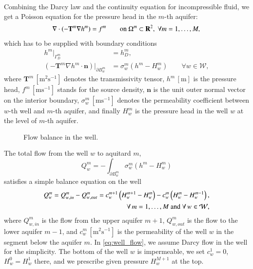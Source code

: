 \documentclass{elsarticle}
\newcommand{\figpath}{../graphics/}
\def\vc#1{\mathbf{\boldsymbol{#1}}}     %
\def\prtl{\partial}
\newcommand{\R}{\mathbf{R}}
\begin{document}
Combining the Darcy law and the continuity equation for incompressible fluid, we get
a Poisson equation for the pressure head in the $m$-th aquifer:
\begin{equation} \label{eqn:poisson}
\nabla\cdot(-\mathbf{T}^m\nabla h^m) = f^m \qquad \textrm{on } \Omega^m\subset\R^2,\; \forall m=1,\dots,M, \\
\end{equation}
which has to be supplied with boundary conditions
\begin{align}
h^m|_{\Gamma^m_D} &= h^m_D, \\
\left(-\mathbf{T}^m\nabla h^m\cdot\vc{n}\right)|_{\partial B^m_w} &= \sigma^m_w(h^m - H^m_w) \qquad \forall w\in\mathcal{W},
\end{align}
where $\mathbf{T}^m\, [\textrm{m}^2\textrm{s}^{-1}]$ denotes the transmissivity tensor,
$h^m\, [\textrm{m}]$ is the pressure head, $f^m\, [\textrm{m}\textrm{s}^{-1}]$ stands for the source density,
$\vc{n}$ is the unit outer normal vector on the interior boundary,
$\sigma^m_w\, [\textrm{m}\textrm{s}^{-1}]$ denotes the permeability coefficient between $w$-th well and 
$m$-th aquifer, and finally $H_w^m$ is the pressure head in the well $w$ at the level of $m$-th aquifer.
%
\begin{figure}[!htb]
  \begin{center}         
    \def\svgwidth{0.5\textwidth}
    
  \end{center}
  \caption{Flow balance in the well.}
  \label{fig:well_flows}
\end{figure}
%
The total flow from the well $w$ to aquitard $m$,
\[
    Q^m_w =-\int_{\prtl B^m_w} \sigma^m_w(h^m - H^m_w)
\]
satisfies a simple balance equation on the well
\begin{align}
    \label{eq:well_flow}
    Q_w^m = Q^m_{w,in} - Q^m_{w,out} = c^{m+1}_w\left( H^{m+1}_w-H^m_w \right) - c_w^m\left( H^m_w-H_w^{m-1}\right),&\\
    \notag
    \forall\,m=1,\dots,M\text{ and }\forall\,w\in\mathcal{W},&
\end{align}
where $Q^m_{w,in}$ is the flow from the upper aquifer $m+1$, $Q^m_{w,out}$ is the flow to the lower aquifer $m-1$, and 
$c^m_w\, [\textrm{m}^2\textrm{s}^{-1}]$ is the permeability of the well $w$ in the segment below the aquifer $m$.
%
In \eqref{eq:well_flow}, we assume Darcy flow in the well for the simplicity. The bottom of the well $w$ is impermeable,
we set $c^1_w=0$, $H^0_w=H^1_w$ there, and we prescribe given pressure $H^{M+1}_w$ at the top.
\end{document}
